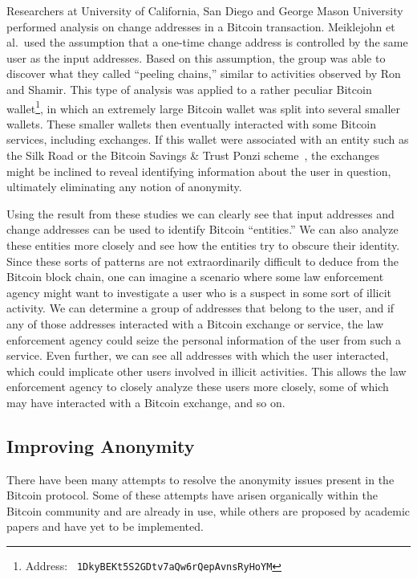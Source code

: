 \documentclass[11pt]{article}
\begin{document}
Researchers at University of California, San Diego and George Mason
University~\cite{meiklejohn13} performed analysis on change addresses in a
Bitcoin transaction. Meiklejohn et al.\ used the assumption that a one-time
change address is controlled by the same user as the input addresses. Based on
this assumption, the group was able to discover what they called ``peeling
chains,'' similar to activities observed by Ron and Shamir. This type of analysis
was applied to a rather peculiar Bitcoin wallet\footnote{Address: {\tt
1DkyBEKt5S2GDtv7aQw6rQepAvnsRyHoYM}}, in which an extremely large Bitcoin wallet
was split into several smaller wallets. These smaller wallets then eventually
interacted with some Bitcoin services, including exchanges. If this wallet were
associated with an entity such as the Silk Road or the Bitcoin Savings \& Trust
Ponzi scheme~\cite{moore13}, the exchanges might be inclined to reveal
identifying information about the user in question, ultimately eliminating any
notion of anonymity.

Using the result from these studies we can clearly see that input addresses and
change addresses can be used to identify Bitcoin ``entities.'' We can also analyze
these entities more closely and see how the entities try to obscure their
identity. Since these sorts of patterns are not extraordinarily difficult to
deduce from the Bitcoin block chain, one can imagine a scenario where some law
enforcement agency might want to investigate a user who is a suspect in some
sort of illicit activity. We can determine a group of addresses that belong to
the user, and if any of those addresses interacted with a Bitcoin exchange or
service, the law enforcement agency could seize the personal
information of the user from such a service. Even further, we can see all
addresses with which the user interacted, which could implicate other users
involved in illicit activities. This allows the law enforcement agency to
closely analyze these users more closely, some of which may have interacted with
a Bitcoin exchange, and so on.

\subsection{Improving Anonymity}
There have been many attempts to resolve the anonymity issues present in the
Bitcoin protocol. Some of these attempts have arisen organically within the
Bitcoin community and are already in use, while others are proposed by academic
papers and have yet to be implemented.
\end{document}
